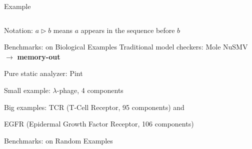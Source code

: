 \documentclass[8pt]{beamer}
\newcommand{\highlight}[1]{\textcolor{blue!50}{\textbf{#1}}}
\begin{document}
\begin{frame}{Example}
\begin{columns}
\begin{column}{0.45\textwidth}
    
\end{column}
\begin{column}{0.55\textwidth}
    
\end{column}
\end{columns}

\vspace{0.5cm}
Notation: $a\rhd b$ means $a$ appears in the sequence before $b$


\end{frame}

\begin{frame}{Benchmarks: on Biological Examples}
Traditional model checkers: Mole NuSMV $\to$ \highlight{memory-out}

Pure static analyzer: Pint%

Small example: $\lambda$-phage, 4 components

Big examples: TCR (T-Cell Receptor, 95 components) and

EGFR (Epidermal Growth Factor Receptor, 106 components)

\small
    \centering
    
\end{frame}

\begin{frame}{Benchmarks: on Random Examples}


\end{frame}
\end{document}
